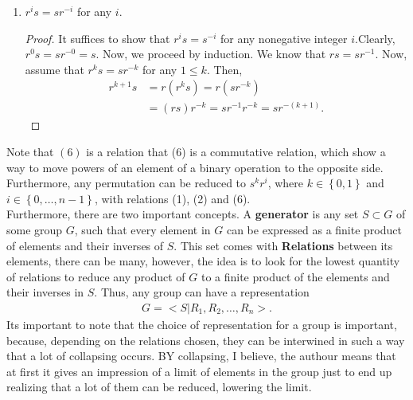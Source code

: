 \documentclass[12pt]{article}
\begin{document}
\begin{enumerate}
\begin{proof}
  Now, $r^{-1}$ brings point $1$ and $2$ to vertices $\overline{n}$ and $\overline{1}$, respectively. Then, $sr^{-1}$ moves points $1$ and $2$ to vertices $\overline{2}$ and $\overline{1}$. \\

  Thus, $rs = sr^{-1}$.
\end{proof}
\item $r^{i}s = sr^{-i}$ for any $i$.
\begin{proof}
  It suffices to show that $r^{i}s = s^{-i}$ for any nonegative integer $i$.Clearly, $r^{0}s = sr^{-0} = s$.  Now, we proceed by induction. We know that $rs = sr^{-1}$. Now, assume that $r^{k}s = sr^{-k}$ for any $1\leq k$. Then, 
\begin{align*}
  r^{k+1}s &= r(r^{k}s) = r(sr^{-k})\\
  &= (rs)r^{-k}= sr^{-1}r^{-k} = sr^{-(k+1)}.
\end{align*}
\end{proof}
\end{enumerate}

Note that $(6)$ is a relation that (6) is a commutative relation, which show a way to move powers of an element of a binary operation to the opposite side. Furthermore, any permutation can be reduced to $s^{k}r^{i}$, where $k\in\left\{ 0,1 \right\}$ and $i\in \left\{ 0,\dots,n-1 \right\}$, with relations (1), (2) and (6).\\

Furthermore, there are two important concepts. A \textbf{generator} is any set $S\subset G$ of some group $G$, such that every element in $G$ can be expressed as a finite product of elements and their inverses of $S$. This set comes with \textbf{Relations} between its elements, there can be many, however, the idea is to look for the lowest quantity of relations to reduce any product of $G$ to a finite product of the elements and their inverses in $S$. Thus, any group can have a representation 
\begin{align*}
  G= <S| R_{1},R_{2},\dots,R_{n}>.
\end{align*}
Its important to note that the choice of representation for a group is important, because, depending on the relations chosen, they can be interwined in such a way that a lot of collapsing occurs. BY collapsing, I believe, the authour means that at first it gives an impression of a limit of elements in the group just to end up realizing that a lot of them can be reduced, lowering the limit. 
       
\end{document}
